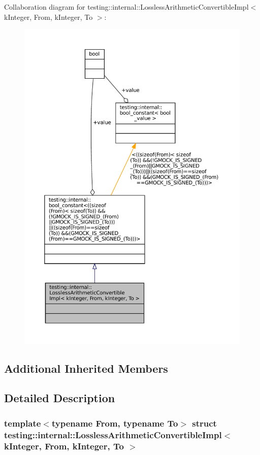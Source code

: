 Collaboration diagram for testing\+:\+:internal\+:\+:Lossless\+Arithmetic\+Convertible\+Impl$<$ k\+Integer, From, k\+Integer, To $>$\+:
\nopagebreak
\begin{figure}[H]
\begin{center}
\leavevmode
\includegraphics[width=350pt]{structtesting_1_1internal_1_1LosslessArithmeticConvertibleImpl_3_01kInteger_00_01From_00_01kInteger_00_01To_01_4__coll__graph}
\end{center}
\end{figure}
\subsection*{Additional Inherited Members}


\subsection{Detailed Description}
\subsubsection*{template$<$typename From, typename To$>$\newline
struct testing\+::internal\+::\+Lossless\+Arithmetic\+Convertible\+Impl$<$ k\+Integer, From, k\+Integer, To $>$}



